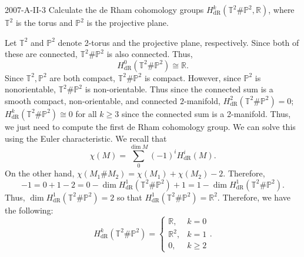 \documentclass{article}
\begin{document}
	
	\begin{prb}{2007-A-II-3}
		Calculate the de Rham cohomology groups $H^{k}_{\text{dR}}(\mathbb{T}^{2} \# \mathbb{P}^{2}, \mathbb{R})$, where $\mathbb{T}^{2}$ is the torus and $\mathbb{P}^{2}$ is the projective plane. 
	\end{prb}
	Let $\mathbb{T}^{2}$ and $\mathbb{P}^{2}$ denote 2-torus and the projective plane, respectively. Since both of these are connected, $\mathbb{T}^{2}\# \mathbb{P}^{2}$ is also connected. Thus, 
	\begin{equation*}
		H^{0}_{\text{dR}}(\mathbb{T}^{2}\# \mathbb{P}^{2}) \cong \mathbb{R}. 
	\end{equation*}
	Since $\mathbb{T}^{2}, \mathbb{P}^{2}$ are both compact, $\mathbb{T}^{2}\# \mathbb{P}^{2}$ is compact. However, since $\mathbb{P}^{2}$ is nonorientable, $\mathbb{T}^{2}\# \mathbb{P}^{2}$ is non-orientable. Thus since the connected sum is a smooth compact, non-orientable, and connected $2$-manifold, $H^{2}_{\text{dR}}(\mathbb{T}^{2} \# \mathbb{P}^{2}) = 0$; $H^{k}_{\text{dR}}(\mathbb{T}^{2} \# \mathbb{P}^{2}) \cong 0$ for all $k \geq 3$ since the connected sum is a 2-manifold. Thus, we just need to compute the first de Rham cohomology group. We can solve this using the Euler characteristic. We recall that 
	\begin{equation*}
		\chi(M) = \sum_{0}^{\dim{M}}(-1)^{i}H^{i}_{\text{dR}}(M). 
	\end{equation*}
	On the other hand, $\chi(M_{1}\# M_{2}) = \chi(M_{1}) + \chi(M_{2}) - 2$. Therefore, 
	\begin{equation*}
		-1 = 0 + 1 - 2 = 0 - \dim{H^{1}_{\text{dR}}(\mathbb{T}^{2}\#\mathbb{P}^{2})} + 1 = 1 - \dim{H^{1}_{\text{dR}}(\mathbb{T}^{2} \# \mathbb{P}^{2})}. 
	\end{equation*}
	Thus, $\dim{H^{1}_{\text{dR}}(\mathbb{T}^{2}\#\mathbb{P}^{2})} = 2$ so that $H^{1}_{\text{dR}}(\mathbb{T}^{2}\#\mathbb{P}^{2}) = \mathbb{R}^{2}$. Therefore, we have the following: 
	\begin{equation*}
		H^{k}_{\text{dR}}(\mathbb{T}^{2}\#\mathbb{P}^{2}) = 
		\begin{cases}
			\mathbb{R}, & k = 0 \\
			\mathbb{R}^{2}, & k = 1 \\
			0, & k \geq 2
		\end{cases}.
	\end{equation*}
	
\end{document}

